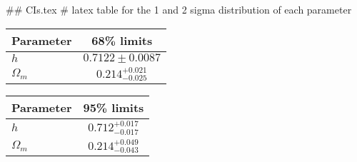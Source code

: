 ## CIs.tex
# latex table for the 1 and 2 sigma distribution of each parameter

\begin{tabular} { l  c}
 Parameter &  68\% limits\\
\hline
{\boldmath$h              $} & $0.7122\pm 0.0087          $\\
{\boldmath$\Omega_m       $} & $0.214^{+0.021}_{-0.025}   $\\
\hline
\end{tabular}

\begin{tabular} { l  c}
 Parameter &  95\% limits\\
\hline
{\boldmath$h              $} & $0.712^{+0.017}_{-0.017}   $\\
{\boldmath$\Omega_m       $} & $0.214^{+0.049}_{-0.043}   $\\
\hline
\end{tabular}
